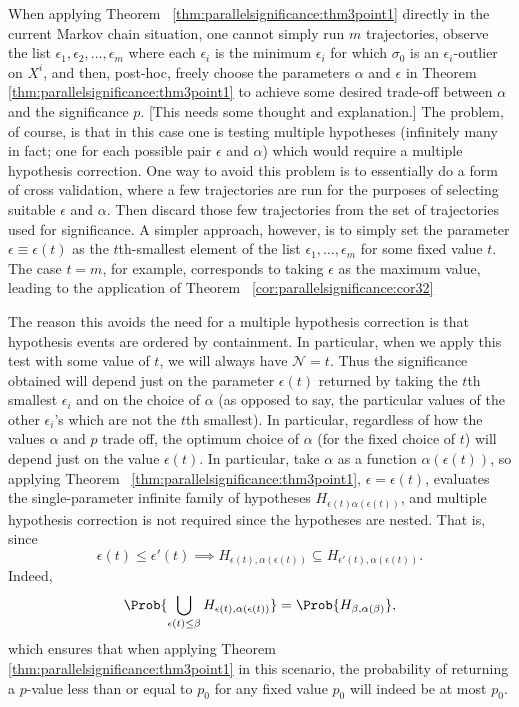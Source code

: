 \documentclass[12pt]{article}
\begin{document}
When applying Theorem~%
\ref{thm:parallelsignificance:thm3point1} directly in the current Markov chain
situation, one cannot simply run \( m \) trajectories, observe the list \(
\epsilon_1 , \epsilon_2, \dots, \epsilon_ m \) where each \( \epsilon_i \)
is the minimum \( \epsilon_i \) for which \( \sigma_0 \) is an \(
\epsilon_i \)-outlier on \( X^i \), and then, post-hoc, freely choose
the parameters \( \alpha \) and \( \epsilon \) in Theorem~%
\ref{thm:parallelsignificance:thm3point1} to achieve some desired trade-off
between \( \alpha \) and the significance \( p \).  [This needs some
thought and explanation.] The problem, of course, is that in this case
one is testing multiple hypotheses (infinitely many in fact; one for
each possible pair \( \epsilon \) and \( \alpha \)) which would require
a multiple hypothesis correction.  One way to avoid this problem is to
essentially do a form of cross validation, where a few trajectories are
run for the purposes of selecting suitable \( \epsilon \) and \( \alpha \).
Then discard those few trajectories from the set of trajectories used
for significance.  A simpler approach, however, is to simply set the
parameter \( \epsilon \equiv \epsilon(t) \) as the \( t \)th-smallest
element of the list \( \epsilon_1, \dots, \epsilon_m \) for some fixed
value \( t \).  The case \( t = m \), for example, corresponds to taking
\( \epsilon \) as the maximum value, leading to the application of
Theorem~%
\ref{cor:parallelsignificance:cor32}

The reason this avoids the need for a multiple hypothesis correction is
that hypothesis events are ordered by containment.  In particular, when
we apply this test with some value of \( t \), we will always have \(
\mathcal{N} = t \).  Thus the significance obtained will depend just on
the parameter \( \epsilon(t) \) returned by taking the \( t \)th
smallest \( \epsilon_i \) and on the choice of \( \alpha \) (as opposed
to say, the particular values of the other \( \epsilon_i \)'s which are
not the \( t \)th smallest).  In particular, regardless of how the
values \( \alpha \) and \( p \) trade off, the optimum choice of \(
\alpha \) (for the fixed choice of \( t \)) will depend just on the
value \( \epsilon(t) \).  In particular, take \( \alpha \) as a function
\( \alpha(\epsilon(t) ) \), so applying Theorem~%
\ref{thm:parallelsignificance:thm3point1}, \( \epsilon = \epsilon(t) \),
evaluates the single-parameter infinite family of hypotheses \( H_{\epsilon
(t) \alpha(\epsilon(t)) } \), and multiple hypothesis correction is not
required since the hypotheses are nested.  That is, since
\[
    \epsilon(t) \le \epsilon' (t) \implies H_{\epsilon(t),\alpha(\epsilon
    (t) )} \subseteq H_{\epsilon' (t) ,\alpha(\epsilon(t) )}.
\] Indeed,
\[
    \Prob{ \bigcup_{\epsilon(t) \le \beta } H_{\epsilon(t) ,\alpha(\epsilon
    (t))} } = \Prob{H_{\beta, \alpha(\beta)}},
\] which ensures that when applying Theorem~%
\ref{thm:parallelsignificance:thm3point1} in this scenario, the probability of
returning a \( p \)-value less than or equal to \( p_0 \) for any fixed
value \( p_0 \) will indeed be at most \( p_0 \).
\end{document}
